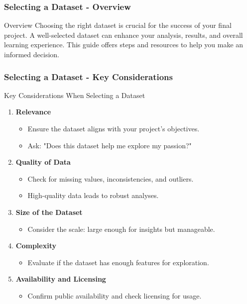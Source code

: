 \documentclass[aspectratio=169]{beamer}
\begin{document}
\begin{frame}[fragile]
    \frametitle{Selecting a Dataset - Overview}
    \begin{block}{Overview}
        Choosing the right dataset is crucial for the success of your final project. 
        A well-selected dataset can enhance your analysis, results, and overall learning experience. 
        This guide offers steps and resources to help you make an informed decision.
    \end{block}
\end{frame}

\begin{frame}[fragile]
    \frametitle{Selecting a Dataset - Key Considerations}
    \begin{block}{Key Considerations When Selecting a Dataset}
        \begin{enumerate}
            \item \textbf{Relevance}  
            \begin{itemize}
                \item Ensure the dataset aligns with your project's objectives. 
                \item Ask: "Does this dataset help me explore my passion?"
            \end{itemize}
            
            \item \textbf{Quality of Data}  
            \begin{itemize}
                \item Check for missing values, inconsistencies, and outliers.
                \item High-quality data leads to robust analyses.
            \end{itemize}
            
            \item \textbf{Size of the Dataset}  
            \begin{itemize}
                \item Consider the scale: large enough for insights but manageable.
            \end{itemize}
            
            \item \textbf{Complexity}  
            \begin{itemize}
                \item Evaluate if the dataset has enough features for exploration.
            \end{itemize}

            \item \textbf{Availability and Licensing}  
            \begin{itemize}
                \item Confirm public availability and check licensing for usage.
            \end{itemize}
        \end{enumerate}
    \end{block}
\end{frame}
\end{document}
